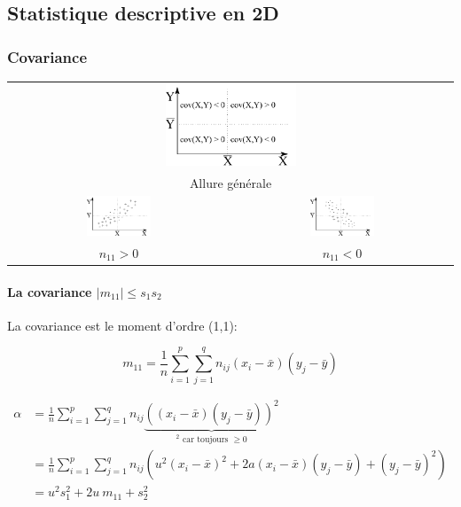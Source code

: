 \subsection{Statistique descriptive en 2D}


\subsubsection{Covariance}

\begin{center}
	\begin{tabular}{cc}
		\multicolumn{2}{c}{\includegraphics[width=0.3\textwidth]{images/covariance-all.pdf}}\\
		\multicolumn{2}{c}{Allure générale}\\
		\includegraphics[width=0.3\textwidth]{images/covariance-positive.pdf}&\includegraphics[width=0.3\textwidth]{images/covariance-negative.pdf}\\
		$n_{11}>0$&$n_{11}<0$
	\end{tabular}
\end{center}





\paragraph{La covariance $|m_{11}| \leq s_1s_2$}

La covariance est le moment d'ordre (1,1):

$$m_{11}=\frac{1}{n} \sum_{i=1}^{p} \sum_{j=1}^{q} n_{ij} (x_i-\bar{x})(y_j-\bar{y})$$

\begin{align*}
	\alpha  &= \frac{1}{n} \sum_{i=1}^{p} \sum_{j=1}^{q} n_{ij} \underbrace{ ((x_i-\bar{x})(y_j-\bar{y}))^2 }_\text{$^2$ car toujours $\geq 0$} \\
	        &= \frac{1}{n} \sum_{i=1}^{p} \sum_{j=1}^{q} n_{ij} (u^2(x_i-\bar{x})^2 + 2a(x_i-\bar{x})(y_j-\bar{y})+(y_j-\bar{y})^2)\\
	        &= u^2s_1^2+2u\ m_{11}+s_2^2
\end{align*}

